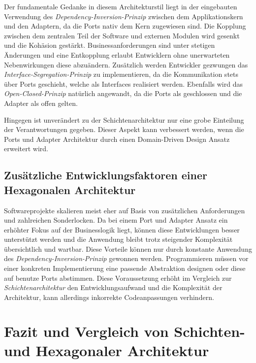 \documentclass[conference]{IEEEtran}
\begin{document}
Der fundamentale Gedanke in diesem Architekturstil liegt in der eingebauten Verwendung des \emph{Dependency-Inversion-Prinzip} zwischen dem Applikationskern und den Adaptern, da die Ports nativ dem Kern zugewiesen sind. Die Kopplung zwischen dem zentralen Teil der Software und externen Modulen wird gesenkt und die Kohäsion gestärkt. Businessanforderungen sind unter stetigen Änderungen und eine Entkopplung erlaubt Entwicklern ohne unerwarteten Nebenwirkungen diese abzuändern. Zusätzlich werden Entwickler gezwungen das \emph{Interface-Segregation-Prinzip} zu implementieren, da die Kommunikation stets über Ports geschieht, welche als Interfaces realisiert werden. Ebenfalls wird das \emph{Open-Closed-Prinzip} natürlich angewandt, da die Ports als geschlossen und die Adapter als offen gelten.


Hingegen ist unverändert zu der Schichtenarchitektur nur eine grobe Einteilung der Verantwortungen gegeben. Dieser Aspekt kann verbessert werden, wenn die Ports und Adapter Architektur durch einen Domain-Driven Design Ansatz erweitert wird.


\subsection{Zusätzliche Entwicklungsfaktoren einer Hexagonalen Architektur}


Softwareprojekte skalieren meist eher auf Basis von zusätzlichen Anforderungen und zahlreichen Sonderlocken. Da bei einem Port und Adapter Ansatz ein erhöhter Fokus auf der Businesslogik liegt, können diese Entwicklungen besser unterstützt werden und die Anwendung bleibt trotz steigender Komplexität übersichtlich und wartbar. Diese Vorteile können nur durch konstante Anwendung des \emph{Dependency-Inversion-Prinzip} gewonnen werden. Programmieren müssen vor einer konkreten Implementierung eine passende Abstraktion designen oder diese auf benutze Ports abstimmen. Diese Voraussetzung erhöht im Vergleich zur \emph{Schichtenarchitektur} den Entwicklungsaufwand und die Komplexität der Architektur, kann allerdings inkorrekte Codeanpassungen verhindern. 



\section{Fazit und Vergleich von Schichten- und Hexagonaler Architektur}
\end{document}
